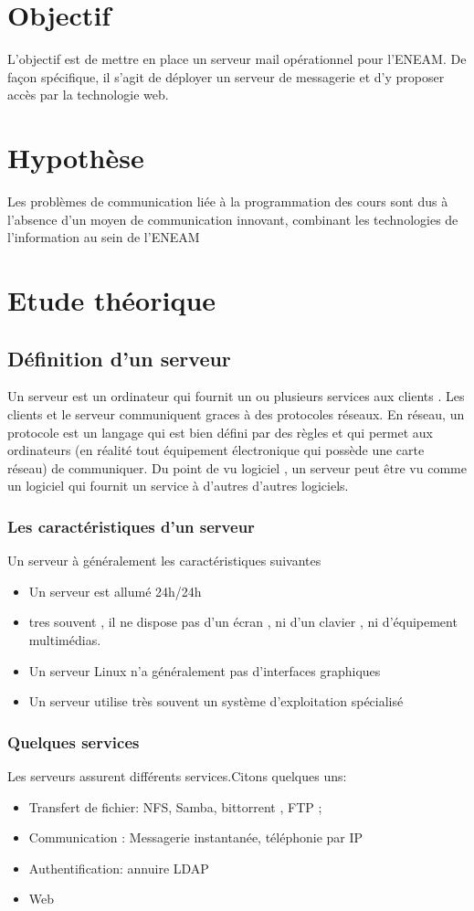 \documentclass[a4paper,12pt,french]{report} %
\begin{document}
	\section{Objectif}
	L'objectif est de mettre en place un serveur mail opérationnel pour l'ENEAM. De façon spécifique, il s'agit de déployer un serveur de messagerie et d'y proposer accès par la technologie web.
	\section{Hypothèse}
	Les problèmes de communication liée à la programmation des cours sont dus à l'absence d'un moyen de communication innovant, combinant les technologies de l'information au sein de l'ENEAM
	\section{Etude théorique}
		\subsection{Définition d'un serveur}
		Un serveur est un ordinateur qui fournit un ou plusieurs services aux clients . Les clients et le serveur communiquent graces à des protocoles réseaux. En réseau, un protocole est un langage qui est bien défini par des règles et qui permet aux ordinateurs (en réalité tout équipement électronique qui possède une carte réseau) de communiquer. Du point de vu logiciel , un serveur peut être vu comme un logiciel qui fournit un service à d'autres d'autres logiciels.

\subsubsection{Les caractéristiques d'un serveur}
Un serveur à généralement les caractéristiques suivantes 
\begin{itemize}
\item Un serveur est allumé 24h/24h
\item tres souvent , il ne dispose pas d'un écran , ni d'un clavier , ni d'équipement multimédias.
\item Un serveur Linux n'a généralement pas d'interfaces graphiques
\item Un serveur utilise très souvent un système d'exploitation spécialisé
\end{itemize}

\subsubsection{Quelques services}
Les serveurs assurent différents services.Citons quelques uns:
\begin{itemize}
\item Transfert de fichier: NFS, Samba, bittorrent , FTP ;
\item Communication : Messagerie instantanée, téléphonie par IP
\item Authentification: annuire LDAP
\item Web
\end{itemize}
\end{document}
